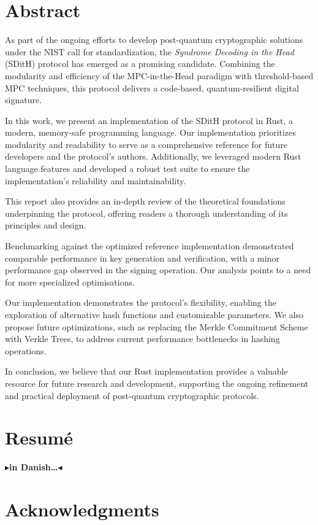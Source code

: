 \documentclass[11pt]{report}
\theoremstyle{definition}
\theoremstyle{plain}
\newcommand{\todo}[1]{{\color[rgb]{.5,0,0}\textbf{$\blacktriangleright$#1$\blacktriangleleft$}}}
\begin{document}
\chapter*{Abstract}
As part of the ongoing efforts to develop post-quantum cryptographic solutions under the NIST call for standardization, the \textit{Syndrome Decoding in the Head} (SDitH) protocol has emerged as a promising candidate. Combining the modularity and efficiency of the MPC-in-the-Head paradigm with threshold-based MPC techniques, this protocol delivers a code-based, quantum-resilient digital signature.

In this work, we present an implementation of the SDitH protocol in Rust, a modern, memory-safe programming language. Our implementation prioritizes modularity and readability to serve as a comprehensive reference for future developers and the protocol's authors. Additionally, we leveraged modern Rust language features and developed a robust test suite to ensure the implementation's reliability and maintainability.

This report also provides an in-depth review of the theoretical foundations underpinning the protocol, offering readers a thorough understanding of its principles and design.

Benchmarking against the optimized reference implementation demonstrated comparable performance in key generation and verification, with a minor performance gap observed in the signing operation. Our analysis points to a need for more specialized optimisations.

Our implementation demonstrates the protocol's flexibility, enabling the exploration of alternative hash functions and customizable parameters. We also propose future optimizations, such as replacing the Merkle Commitment Scheme with Verkle Trees, to address current performance bottlenecks in hashing operations.

In conclusion, we believe that our Rust implementation provides a valuable resource for future research and development, supporting the ongoing refinement and practical deployment of post-quantum cryptographic protocols.

\chapter*{Resum\'e}

\todo{in Danish\dots}

\chapter*{Acknowledgments}
\end{document}
